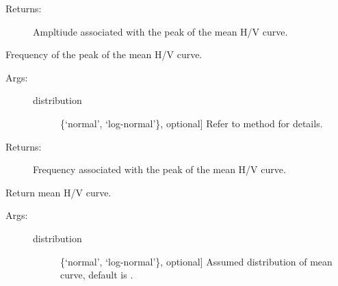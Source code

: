 \documentclass[letterpaper,10pt,english,openany,oneside]{sphinxmanual}
\begin{document}
\begin{fulllineitems}
\begin{fulllineitems}
\begin{description}
\begin{description}
\end{description}

\item[{Returns:}] \leavevmode
Ampltiude associated with the peak of the mean H/V curve.

\end{description}

\end{fulllineitems}


\begin{fulllineitems}
\label{\detokenize{index:hvsrpy.Hvsr.mc_peak_frq}}
Frequency of the peak of the mean H/V curve.
\begin{description}
\item[{Args:}] \leavevmode\begin{description}
\item[{distribution}] \leavevmode{[}\{‘normal’, ‘log-normal’\}, optional{]}
Refer to method  for details.

\end{description}

\item[{Returns:}] \leavevmode
Frequency associated with the peak of the mean H/V curve.

\end{description}

\end{fulllineitems}


\begin{fulllineitems}
\label{\detokenize{index:hvsrpy.Hvsr.mean_curve}}
Return mean H/V curve.
\begin{description}
\item[{Args:}] \leavevmode\begin{description}
\item[{distribution}] \leavevmode{[}\{‘normal’, ‘log-normal’\}, optional{]}
Assumed distribution of mean curve, default is 
.

\end{description}


\end{description}
\end{fulllineitems}
\end{fulllineitems}
\end{document}
